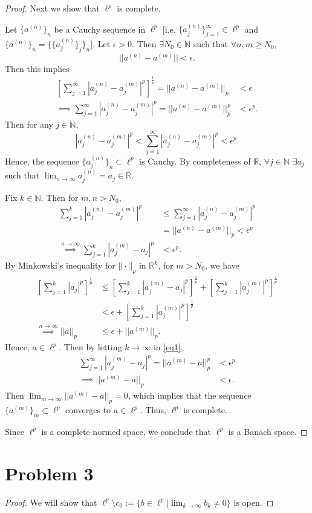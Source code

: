 \documentclass{article}
\begin{document}
\begin{proof}
	Next we show that $\ell^p$ is complete. 
	
	Let $\{a^{(n)}\}_n$ be a Cauchy sequence in $\ell^p$ [i.e. $\{a_j^{(n)}\}_{j=1}^{\infty}\in\ell^p$ and $\{a^{(n)}\}_n=\{\{a_j^{(n)}\}_{j}\}_{n}$]. Let $\epsilon>0$. Then $\exists N_0\in\mathbb{N}$ such that $\forall n,m\geq N_0$,
	\begin{equation}
		||a^{(n)}-a^{(m)}||<\epsilon.
	\end{equation}
	Then this implies
	\begin{align}
		\left[\sum_{j=1}^{\infty}|a_j ^{(n)} - a_j ^{(m)}|^p\right]^\frac{1}{p} = ||a^{(n)}-a^{(m)}||_p &< \epsilon \\
		\implies \sum_{j=1}^{\infty} |a_j ^{(n)} - a_j ^{(m)}|^p = ||a^{(n)}-a^{(m)}||_p ^{p} &< \epsilon^p.
	\end{align}
	Then for any $j\in\mathbb{N}$, 
	\begin{equation}
		|a_j ^{(n)} - a_j ^{(m)}|^p < \sum_{j=1}^{\infty} |a_j ^{(n)} - a_j ^{(m)}|^p < \epsilon^p.
	\end{equation}
	Hence, the sequence $\{a_j^{(n)}\}_n \subset \ell^p$ is Cauchy. By completeness of $\mathbb{R}$, $\forall j\in\mathbb{N}$ $\exists a_j$ such that $\lim_{n \to \infty} a_j ^{(n)} = a_j \in \mathbb{R}$. 
	
	Fix $k\in\mathbb{N}$. Then for $m,n > N_0$, 
	\begin{align}
		\sum_{j=1}^k |a_j ^{(n)}-a_j^{(m)}|^p &\leq \sum_{j=1}^{\infty} |a_j ^{(n)}-a_j^{(m)}|^p \\
		&= ||a^{(n)}-a^{(m)}||_p < \epsilon^p\\
		\overset{n \to \infty}\implies 	\sum_{j=1}^k |a_j ^{(m)}-a_j|^p &< \epsilon^p. \label{eq1} 
	\end{align}
	By Minkowski's inequality for $||\cdot||_p$ in $\mathbb{R}^k$, for $m>N_0$, we have
	\begin{align}
		\left[\sum_{j=1}^k |a_j|^p\right]^\frac{1}{p} &\leq \left[\sum_{j=1}^k |a_j^{(m)}-a_j|^p\right]^\frac{1}{p} + \left[\sum_{j=1}^k |a_j^{(m)}|^p\right]^\frac{1}{p} \\
		&< \epsilon + \left[\sum_{j=1}^k |a_j^{(m)}|^p\right]^\frac{1}{p} \\
		\overset{n \to \infty}\implies ||a||_p &\leq \epsilon + ||a^{(m)}||_p.
	\end{align}
	Hence, $a \in \ell^p$. Then by letting $k \to \infty$ in \eqref{eq1}, 
	\begin{align}
		\sum_{j=1}^{\infty} |a_j ^{(m)}-a_j|^p = ||a^{(m)}-a||_p ^{p} &< \epsilon ^p \\
		\implies ||a^{(m)}-a||_p &< \epsilon.  
	\end{align}
	Then $\lim_{m \to \infty} ||a^{(m)}-a||_p = 0$, which implies that the sequence $\{a^{(m)}\}_m \subset \ell^p$  converges to $a\in\ell^p$. Thus, $\ell^p$ is complete.
	
	Since $\ell^p$ is a complete normed space, we conclude that $\ell^p$ is a Banach space. 
\end{proof}

\section*{Problem 3}
\begin{proof}
	We will show that $\ell^p \setminus c_0 := \{b\in\ell^p | \lim_{k \to\infty} b_k \neq 0\}$ is open. 
\end{proof}
\end{document}
